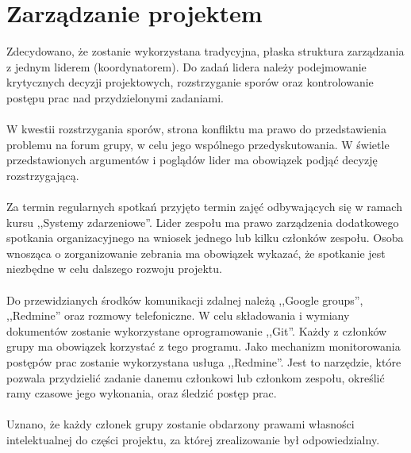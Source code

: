 \section{Zarządzanie projektem}
\noindent Zdecydowano, że zostanie wykorzystana tradycyjna, płaska struktura
zarządzania z jednym liderem (koordynatorem).  Do zadań lidera należy
podejmowanie krytycznych decyzji projektowych, rozstrzyganie sporów
oraz kontrolowanie postępu prac nad przydzielonymi zadaniami.
\\\\
\noindent W kwestii rozstrzygania sporów, strona konfliktu ma prawo do
przedstawienia problemu na forum grupy, w celu jego wspólnego
przedyskutowania.  W świetle przedstawionych argumentów i poglądów
lider ma obowiązek podjąć decyzję rozstrzygającą.
\\\\
\noindent Za termin regularnych spotkań przyjęto termin zajęć odbywających się w
ramach kursu ,,Systemy zdarzeniowe''. Lider zespołu ma prawo
zarządzenia dodatkowego spotkania organizacyjnego na wniosek jednego
lub kilku członków zespołu.  Osoba wnosząca o zorganizowanie zebrania
ma obowiązek wykazać, że spotkanie jest niezbędne w celu dalszego
rozwoju projektu.
\\\\
\noindent Do przewidzianych środków komunikacji zdalnej należą ,,Google
groups'', ,,Redmine'' oraz rozmowy telefoniczne.  W celu składowania i
wymiany dokumentów zostanie wykorzystane oprogramowanie ,,Git''.
Każdy z członków grupy ma obowiązek korzystać z tego programu.  Jako
mechanizm monitorowania postępów prac zostanie wykorzystana usługa
,,Redmine''.  Jest to narzędzie, które pozwala przydzielić zadanie
danemu członkowi lub członkom zespołu, określić ramy czasowe jego
wykonania, oraz śledzić postęp prac.
\\\\
\noindent Uznano, że każdy członek grupy zostanie obdarzony prawami własności
intelektualnej do części projektu, za której zrealizowanie był
odpowiedzialny.
